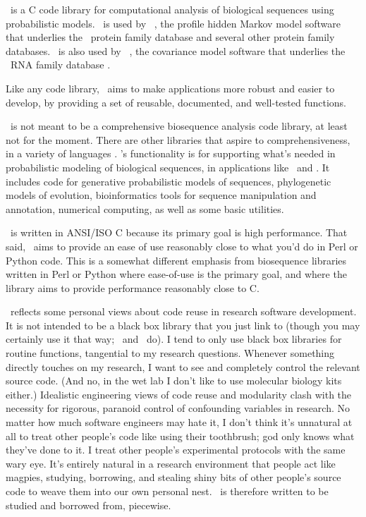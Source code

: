 

\Easel\ is a C code library for computational analysis of biological
sequences using probabilistic models. \Easel\ is used by \HMMER\ 
\citep{hmmer,Eddy98}, the profile hidden Markov model software that
underlies the \Pfam\ protein family database
\citep{Finn06,Sonnhammer97} and several other protein family
databases. \Easel\ is also used by \Infernal\ 
\citep{infernal,NawrockiEddy07}, the covariance model software that
underlies the \Rfam\ RNA family database
\citep{Griffiths-Jones05}. 

Like any code library, \Easel\ aims to make applications more robust
and easier to develop, by providing a set of reusable, documented, and
well-tested functions.

\Easel\ is not meant to be a comprehensive biosequence analysis code
library, at least not for the moment. There are other libraries that
aspire to comprehensiveness, in a variety of languages
\citep{Vahrson96,Pitt01,Mangalam02,Butt05,Dutheil06,Giancarlo07,Doring08}.
\Easel's functionality is for supporting what's needed in
probabilistic modeling of biological sequences, in applications like
\HMMER\ and \Infernal. It includes code for generative probabilistic
models of sequences, phylogenetic models of evolution, bioinformatics
tools for sequence manipulation and annotation, numerical computing,
as well as some basic utilities.

\Easel\ is written in ANSI/ISO C because its primary goal is high
performance. That said, \Easel\ aims to provide an ease of use
reasonably close to what you'd do in Perl or Python code. This is a
somewhat different emphasis from biosequence libraries written in Perl
or Python where ease-of-use is the primary goal, and where the library
aims to provide performance reasonably close to C.

\Easel\ reflects some personal views about code reuse in research
software development. It is not intended to be a black box library
that you just link to (though you may certainly use it that way;
\HMMER\ and \Infernal\ do). I tend to only use black box libraries for
routine functions, tangential to my research questions. Whenever
something directly touches on my research, I want to see and
completely control the relevant source code. (And no, in the wet lab I
don't like to use molecular biology kits either.)  Idealistic
engineering views of code reuse and modularity clash with the
necessity for rigorous, paranoid control of confounding variables in
research. No matter how much software engineers may hate it, I don't
think it's unnatural at all to treat other people's code like using
their toothbrush; god only knows what they've done to it. I treat
other people's experimental protocols with the same wary eye.  It's
entirely natural in a research environment that people act like
magpies, studying, borrowing, and stealing shiny bits of other
people's source code to weave them into our own personal nest. \Easel\
is therefore written to be studied and borrowed from, piecewise.

